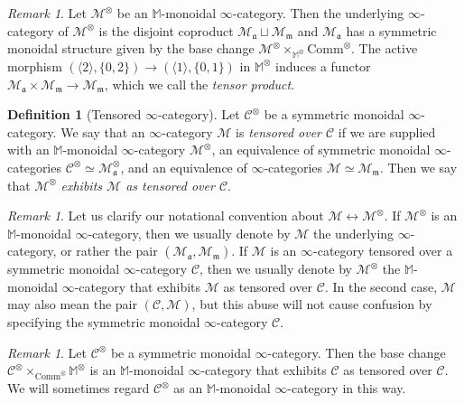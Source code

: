 \documentclass{amsart}
\theoremstyle{plain}
\theoremstyle{definition}
\newtheorem{definition}[theorem]{Definition}
\theoremstyle{remark}
\newtheorem{remark}[theorem]{Remark}
\numberwithin{equation}{theorem}
\newcommand{\mcal}[1]{\mathcal{#1}}
\newcommand{\mbb}[1]{\mathbb{#1}}
\newcommand{\mfk}[1]{\mathfrak{#1}}
\newcommand{\Comm}{\mathrm{Comm}}
\begin{document}
\begin{remark}
Let $\mcal{M}^\otimes$ be an $\mbb{M}$-monoidal $\infty$-category.
Then the underlying $\infty$-category of $\mcal{M}^\otimes$ is the disjoint coproduct $\mcal{M}_\mfk{a}\sqcup\mcal{M}_\mfk{m}$ and $\mcal{M}_\mfk{a}$ has a symmetric monoidal structure given by the base change $\mcal{M}^\otimes\times_{\mbb{M}^\otimes}\Comm^\otimes$.
The active morphism $(\langle 2\rangle,\{0,2\})\to(\langle 1\rangle,\{0,1\})$ in $\mbb{M}^\otimes$ induces a functor $\mcal{M}_\mfk{a}\times\mcal{M}_\mfk{m}\to\mcal{M}_\mfk{m}$, which we call the \textit{tensor product}.
\end{remark}

\begin{definition}[Tensored $\infty$-category]\label{def:Mod2}
Let $\mcal{C}^\otimes$ be a symmetric monoidal $\infty$-category.
We say that an $\infty$-category $\mcal{M}$ is \textit{tensored over $\mcal{C}$} if we are supplied with an $\mbb{M}$-monoidal $\infty$-category $\mcal{M}^\otimes$, an equivalence of symmetric monoidal $\infty$-categories $\mcal{C}^\otimes\simeq\mcal{M}_\mfk{a}^\otimes$, and an equivalence of $\infty$-categories $\mcal{M}\simeq\mcal{M}_\mfk{m}$.
Then we say that $\mcal{M}^\otimes$ \textit{exhibits $\mcal{M}$ as tensored over $\mcal{C}$}.
\end{definition}

\begin{remark}
Let us clarify our notational convention about $\mcal{M}\leftrightarrow\mcal{M}^\otimes$.
If $\mcal{M}^\otimes$ is an $\mbb{M}$-monoidal $\infty$-category, then we usually denote by $\mcal{M}$ the underlying $\infty$-category, or rather the pair $(\mcal{M}_\mfk{a},\mcal{M}_\mfk{m})$.
If $\mcal{M}$ is an $\infty$-category tensored over a symmetric monoidal $\infty$-category $\mcal{C}$, then we usually denote by $\mcal{M}^\otimes$ the $\mbb{M}$-monoidal $\infty$-category that exhibits $\mcal{M}$ as tensored over $\mcal{C}$.
In the second case, $\mcal{M}$ may also mean the pair $(\mcal{C},\mcal{M})$, but this abuse will not cause confusion by specifying the symmetric monoidal $\infty$-category $\mcal{C}$.
\end{remark}

\begin{remark}
Let $\mcal{C}^\otimes$ be a symmetric monoidal $\infty$-category.
Then the base change $\mcal{C}^\otimes\times_{\Comm^\otimes}\mbb{M}^\otimes$ is an $\mbb{M}$-monoidal $\infty$-category that exhibits $\mcal{C}$ as tensored over $\mcal{C}$.
We will sometimes regard $\mcal{C}^\otimes$ as an $\mbb{M}$-monoidal $\infty$-category in this way.
\end{remark}
\end{document}
